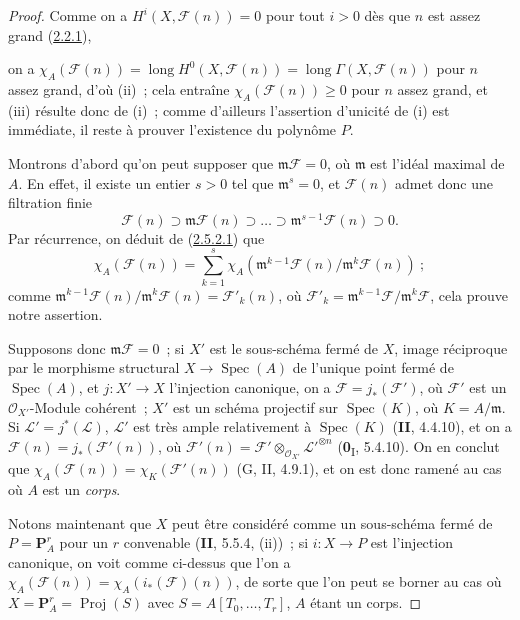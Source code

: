 \begin{proof}
Comme on a $H^i(X,\mathcal F(n))=0$ pour tout $i>0$ dès que $n$ est
assez grand (\hyperref[III.2.2.1-fr]{2.2.1}),

on a
$\chi_A(\mathcal F(n))=\operatorname{long}H^0(X,\mathcal F(n))
=\operatorname{long}\Gamma(X,\mathcal F(n))$
pour $n$ assez grand, d'où (ii)~; cela entraîne
$\chi_A(\mathcal F(n))\geq0$ pour $n$ assez grand, et (iii) résulte donc
de (i)~; comme d'ailleurs l'assertion d'unicité de (i) est immédiate, il
reste à prouver l'existence du polynôme $P$.

Montrons d'abord qu'on peut supposer que $\mathfrak m\mathcal F=0$, où
$\mathfrak m$ est l'idéal maximal de $A$. En effet, il existe un entier
$s>0$ tel que $\mathfrak m^s=0$, et $\mathcal F(n)$ admet donc une
filtration finie
\[
\mathcal F(n)\supset\mathfrak m\mathcal F(n)\supset\ldots
\supset\mathfrak m^{s-1}\mathcal F(n)\supset0.
\]
Par récurrence, on déduit de
(\hyperref[III.2.5.2.1-fr]{2.5.2.1}) que
\[
\chi_A(\mathcal F(n))=\sum_{k=1}^{s}
\chi_A(\mathfrak m^{k-1}\mathcal F(n)/\mathfrak m^k\mathcal F(n))~;
\]
comme
$\mathfrak m^{k-1}\mathcal F(n)/\mathfrak m^k\mathcal F(n)
=\mathcal F'_k(n)$, où
$\mathcal F'_k=\mathfrak m^{k-1}\mathcal F/\mathfrak m^k\mathcal F$,
cela prouve notre assertion.

Supposons donc $\mathfrak m\mathcal F=0$~; si $X'$ est le sous-schéma
fermé de $X$, image réciproque par le morphisme structural
$X\to\operatorname{Spec}(A)$ de l'unique point fermé de
$\operatorname{Spec}(A)$, et $j:X'\to X$ l'injection canonique, on a
$\mathcal F=j_*(\mathcal F')$, où $\mathcal F'$ est un
$\mathcal O_{X'}$-Module cohérent~; $X'$ est un schéma projectif sur
$\operatorname{Spec}(K)$, où $K=A/\mathfrak m$. Si
$\mathcal L'=j^*(\mathcal L)$, $\mathcal L'$ est très ample relativement
à $\operatorname{Spec}(K)$ (\textbf{II}, 4.4.10), et on a
$\mathcal F(n)=j_*(\mathcal F'(n))$, où
$\mathcal F'(n)=\mathcal F'\otimes_{\mathcal O_{X'}}
\mathcal L'^{\otimes n}$ (\textbf{0}\textsubscript{I}, 5.4.10). On en conclut que
$\chi_A(\mathcal F(n))=\chi_K(\mathcal F'(n))$ (G, II, 4.9.1), et on est
donc ramené au cas où $A$ est un \emph{corps}.

Notons maintenant que $X$ peut être considéré comme un sous-schéma
fermé de $P=\mathbf P_A^r$ pour un $r$ convenable (\textbf{II}, 5.5.4, (ii))~;
si $i:X\to P$ est l'injection canonique, on voit comme ci-dessus que l'on
a $\chi_A(\mathcal F(n))=\chi_A(i_*(\mathcal F)(n))$, de sorte que l'on
peut se borner au cas où $X=\mathbf P_A^r=\operatorname{Proj}(S)$ avec
$S=A[T_0,\ldots,T_r]$, $A$ étant un corps.


\end{proof}
